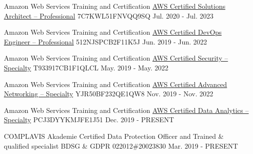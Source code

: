 

\begin{cventries}

  \cventry
    {Amazon Web Services Training and Certification}
    {\href{https://www.youracclaim.com/badges/e00de02f-620b-41b5-8ad7-3caaa7993bc9}{AWS Certified Solutions Architect – Professional}}
    {7C7KWL51FNVQQ9SQ}
    {Jul. 2020 - Jul. 2023}
    {}

\cventry
    {Amazon Web Services Training and Certification}
    {\href{https://www.youracclaim.com/badges/47430bb9-b9ea-4927-97af-c79b3a9c6d04}{AWS Certified DevOps Engineer – Professional}}
    {512NJSPCB2F11K5J}
    {Jun. 2019 - Jun. 2022}
    {}

\cventry
    {Amazon Web Services Training and Certification}
    {\href{https://www.youracclaim.com/badges/2cd78cd7-189d-41cd-ac59-535b65cef3f9}{AWS Certified Security – Specialty}}
    {T933917CB1F1QLCL}
    {May. 2019 - May. 2022}
    {}

\cventry
    {Amazon Web Services Training and Certification}
    {\href{https://www.youracclaim.com/badges/1eada9e9-bdeb-4bcc-b056-5519c722a312}{AWS Certified Advanced Networking – Specialty}}
    {YJR50BF232QE1QW8}
    {Nov. 2019 - Nov. 2022}
    {}

\cventry
    {Amazon Web Services Training and Certification}
    {\href{https://www.youracclaim.com/badges/ea88e1a0-800e-4d98-b116-a9614a40966c}{AWS Certified Data Analytics – Specialty}}
    {PCJ3DYYKMJFE1J51}
    {Dec. 2019 - PRESENT}
    {}

\cventry
    {COMPLAVIS Akademie}
    {Certified Data Protection Officer and Trained \& qualified specialist BDSG \& GDPR}
    {022012\#20023830}
    {Mar. 2019 - PRESENT}
    {}

\end{cventries}
